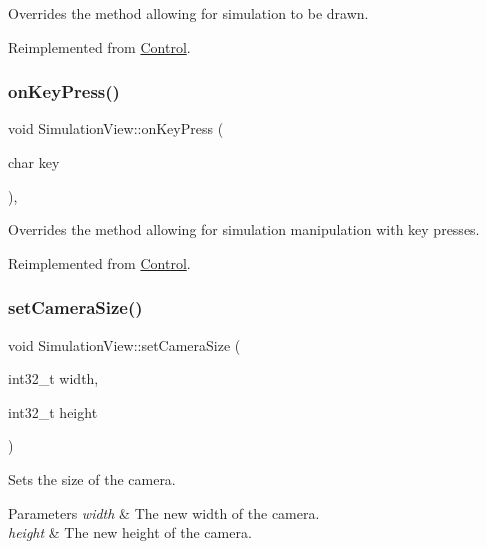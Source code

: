 Overrides the method allowing for simulation to be drawn. 



Reimplemented from \mbox{\hyperlink{class_control_a5f89270d0d05a6bac9128db0b1d290d2}{Control}}.

\mbox{\label{class_simulation_view_a3663c5246a999ab4f2ffd503c0e3d274}} 
\subsubsection{\texorpdfstring{onKeyPress()}{onKeyPress()}}
{\footnotesize\ttfamily void Simulation\+View\+::on\+Key\+Press (\begin{DoxyParamCaption}\item[{char}]{key }\end{DoxyParamCaption})\hspace{0.3cm}{\ttfamily [override]}, {\ttfamily [virtual]}}



Overrides the method allowing for simulation manipulation with key presses. 



Reimplemented from \mbox{\hyperlink{class_control_a4731a62a9ea0510d51924509ae74c93e}{Control}}.

\mbox{\label{class_simulation_view_a5b0c0ffd8978f7841286be2d06483914}} 
\subsubsection{\texorpdfstring{setCameraSize()}{setCameraSize()}}
{\footnotesize\ttfamily void Simulation\+View\+::set\+Camera\+Size (\begin{DoxyParamCaption}\item[{int32\+\_\+t}]{width,  }\item[{int32\+\_\+t}]{height }\end{DoxyParamCaption})}



Sets the size of the camera. 


\begin{DoxyParams}{Parameters}
{\em width} & The new width of the camera.\\
\hline
{\em height} & The new height of the camera.\\
\hline
\end{DoxyParams}
\mbox{\label{class_simulation_view_a6e28ca1ab7e2805561d4c3ec9e6c7d7c}} 
